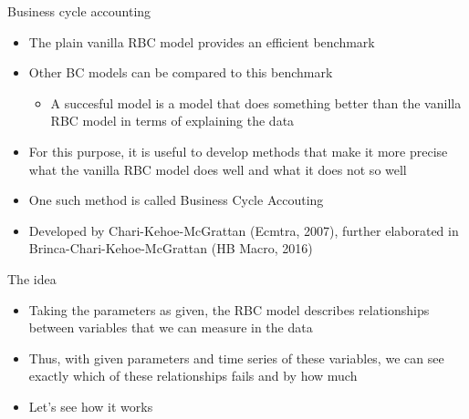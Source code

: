 \documentclass[9pt,xcolor={dvipsnames}]{beamer}
\newcommand{\bit}{\begin{itemize}}
\newcommand{\eit}{\end{itemize}}
\newcommand{\bc}{\color{blue}}
\begin{document}
\begin{frame}{Business cycle accounting}

\bit
\setlength\itemsep{1.5em} 

\item The plain vanilla RBC model provides an efficient benchmark

\item Other BC models can be compared to this benchmark
\bit
	\item A succesful model is a model that does something better than the vanilla RBC model in terms of explaining the data
\eit

\item For this purpose, it is useful to develop methods that make it more precise what the vanilla RBC model does well and what it does not so well

\item One such method is called {\bc Business Cycle Accouting}

\item Developed by Chari-Kehoe-McGrattan (Ecmtra, 2007), further elaborated in Brinca-Chari-Kehoe-McGrattan (HB Macro, 2016)

\eit

\end{frame}

\begin{frame}{The idea}

\bit
\setlength\itemsep{1.5em} 

\item Taking the parameters as given, the RBC model describes relationships between variables that we can measure in the data

\item Thus, with given parameters and time series of these variables, we can see exactly which of these relationships fails and by how much

\item Let's see how it works

\eit

\end{frame}
\end{document}
